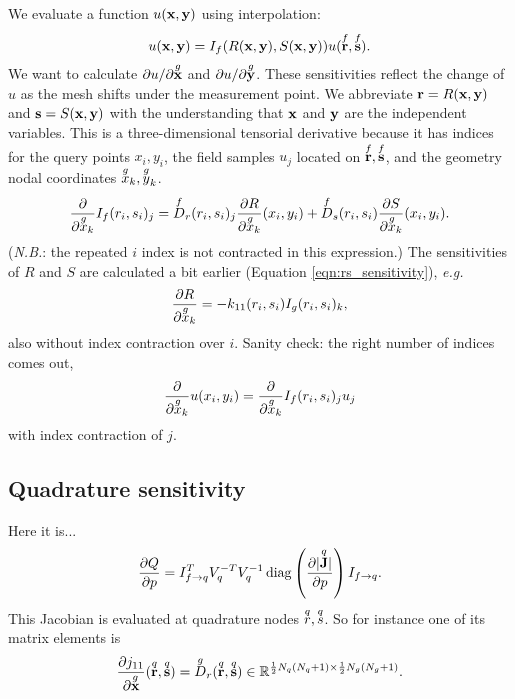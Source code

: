 We evaluate a function $u(\textbf{x}, \textbf{y})$ using interpolation:
%
\begin{equation}
u(\textbf{x}, \textbf{y}) = I_f(R(\textbf{x}, \textbf{y}), S(\textbf{x}, \textbf{y})) u(\overset{f}{\textbf{r}}, \overset{f}{\textbf{s}}).
\end{equation}
%
We want to calculate $\partial{u}/\partial{\overset{g}{\textbf{x}}}$ and $\partial{u}/\partial{\overset{g}{\textbf{y}}}$.  These sensitivities reflect the change of $u$ as the mesh shifts under the measurement point.  We abbreviate $\textbf{r} = R(\textbf{x}, \textbf{y})$ and $\textbf{s} = S(\textbf{x}, \textbf{y})$ with the understanding that $\textbf{x}$ and $\textbf{y}$ are the independent variables.  This is a three-dimensional tensorial derivative because it has indices for the query points $x_i, y_i$, the field samples $u_j$ located on $\overset{f}{\textbf{r}}, \overset{f}{\textbf{s}}$, and the geometry nodal coordinates $\overset{g}{x}_k, \overset{g}{y}_k$.
%
\begin{equation}
\frac{\partial{}}{\partial{\overset{g}{x}_k}} I_f(r_i, s_i)_j = \overset{f}{D}_r(r_i, s_i)_j \frac{\partial{R}}{\partial{\overset{g}{x}_k}}(x_i, y_i) + \overset{f}{D}_s(r_i, s_i) \frac{\partial{S}}{\partial{\overset{g}{x}_k}}(x_i, y_i).
\end{equation}
%
(\emph{N.B.}: the repeated $i$ index is not contracted in this expression.)  The sensitivities of $R$ and $S$ are calculated a bit earlier (Equation \ref{eqn:rs_sensitivity}), \emph{e.g.}
%
\begin{equation}
\frac{\partial{R}}{\partial{\overset{g}{x}_k}} = -k_{11}(r_i, s_i) I_g(r_i, s_i)_k,
\end{equation}
%
also without index contraction over $i$.  Sanity check: the right number of indices comes out,
%
\begin{equation}
\frac{\partial{}}{\partial{\overset{g}{x}_k}}u(x_i, y_i) = \frac{\partial{}}{\partial{\overset{g}{x}_k}} I_f(r_i, s_i)_j u_j
\end{equation}
%
with index contraction of $j$.


\subsection{Quadrature sensitivity}

Here it is...
%
\begin{equation}
\frac{\partial{Q}}{\partial{p}} = I_{f \rightarrow q}^T V_q^{-T} V_q^{-1} \operatorname{diag} \left(  \frac{\partial{| \overset{q}{\textbf{J}} |}}{\partial{p}} \right) I_{f \rightarrow q}.
\end{equation}
%
This Jacobian is evaluated at quadrature nodes $\overset{q}{r}, \overset{q}{s}$.  So for instance one of its matrix elements is
%
\begin{equation}
\frac{\partial{j_{11}}}{\partial{\overset{g}{\textbf{x}}}}(\overset{q}{\textbf{r}}, \overset{q}{\textbf{s}}) = \overset{g}{D}_r(\overset{q}{\textbf{r}}, \overset{q}{\textbf{s}}) \in \mathbb{R}^{\frac{1}{2}N_q(N_q+1) \times \frac{1}{2}N_g(N_g+1)}.
\end{equation}







